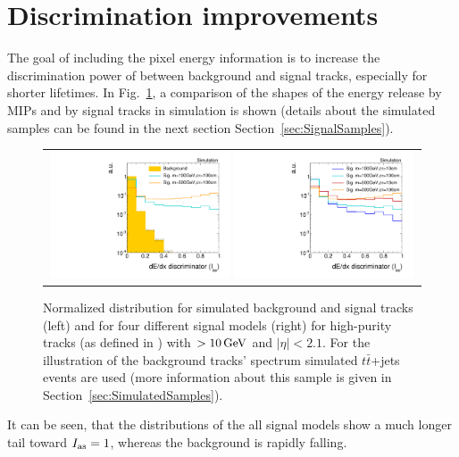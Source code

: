 \section{Discrimination improvements}
The goal of including the pixel energy information is to increase the discrimination power of \ias between background and signal tracks, especially for shorter lifetimes.
In Fig.~\ref{fig:MIPs-Signal-Dedx}, a comparison of the shapes of the energy release by MIPs and by signal tracks in simulation is shown (details about the simulated samples can be found in the next section Section~\ref{sec:SignalSamples}).
\begin{figure}[!bt]
  \centering 
  \begin{tabular}{c}
    \includegraphics[width=0.49\textwidth]{figures/analysis/PixelCalibration/htrackASmiSmallRange_log_chiTracksGoodQualitySelection_2Signal_ttjets.pdf}   
    \includegraphics[width=0.49\textwidth]{figures/analysis/PixelCalibration/htrackASmiSmallRange_log_chiTracksGoodQualitySelection_4Signal.pdf}
  \end{tabular}
  \caption{Normalized \ias distribution for simulated background and signal tracks (left) and for four different signal models (right) 
           for high-purity tracks (as defined in \cite{bib:CMS:Tracking_2010}) with \pt$>10\,\text{Ge}\kern-0.06667em\text{V}$ and $|\eta|<2.1$.
           For the illustration of the background tracks' spectrum simulated $t\bar{t}$+jets events are used (more information about this sample is given in Section~\ref{sec:SimulatedSamples}).}
  \label{fig:MIPs-Signal-Dedx}
\end{figure} 
It can be seen, that the \ias distributions of the all signal models show a much longer tail toward $I_{\text{as}}=1$, whereas the background is rapidly falling.
